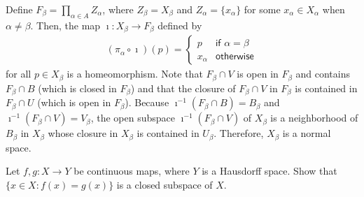 \begin{sol}
\begin{enumerate}
{            Define $F_\beta=\prod_{\alpha\in A} Z_\alpha$, where $Z_\beta=X_\beta$ and $Z_\alpha=\{x_\alpha\}$ for some $x_\alpha\in X_\alpha$ when $\alpha\neq\beta$.
            Then, the map $\imath: X_\beta\rightarrow F_\beta$ defined by
            \begin{eqnarray*}
                (\pi_\alpha\circ\imath)(p)=\left\{\begin{matrix}
                    p & \textsf{if }\alpha=\beta\\
                    x_\alpha & \textsf{otherwise}
                \end{matrix}\right.
            \end{eqnarray*}
            for all $p\in X_\beta$ is a homeomorphism.
            Note that $F_\beta\cap V$ is open in $F_\beta$ and contains $F_\beta\cap B$ (which is closed in $F_\beta$) and that the closure of $F_\beta\cap V$ in $F_\beta$ is contained in $F_\beta\cap U$ (which is open in $F_\beta$).
            Because $\imath^{-1}(F_\beta\cap B)=B_\beta$ and $\imath^{-1}(F_\beta\cap V)=V_\beta$, the open subspace $\imath^{-1}(F_\beta\cap V)$ of $X_\beta$ is a neighborhood of $B_\beta$ in $X_\beta$ whose closure in $X_\beta$ is contained in $U_\beta$.
            Therefore, $X_\beta$ is a normal space.
        }
    \end{enumerate}
\end{sol}

\color{red}
\begin{prob}
    Let $f, g: X\rightarrow Y$ be continuous maps, where $Y$ is a Hausdorff space.
    Show that $\{x\in X: f(x)=g(x)\}$ is a closed subspace of $X$.
\end{prob}
\begin{sol}
    
\end{sol}
\color{black}